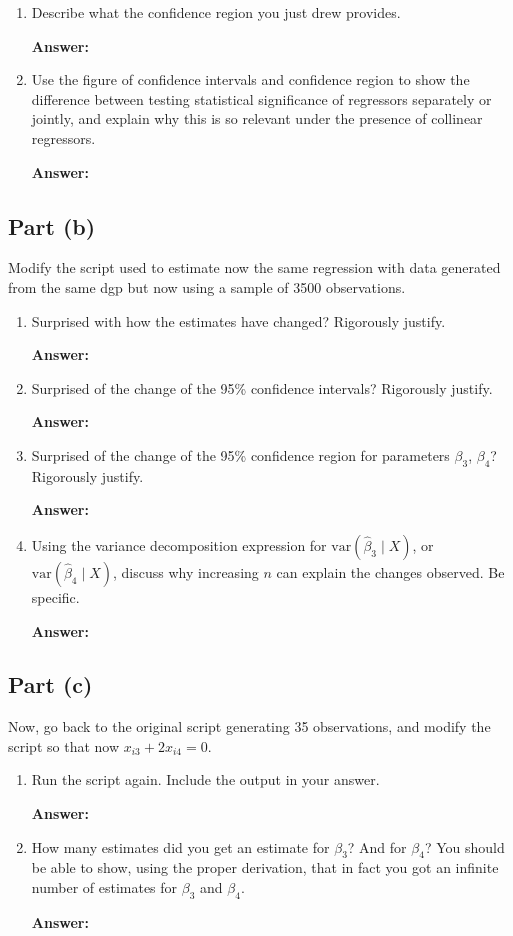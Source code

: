 \documentclass[12pt,a4paper]{article}
\begin{document}
\begin{enumerate}[label=(\roman*)]
  \item Describe what the confidence region you just drew provides.
  
  \textbf{Answer:} 
  
  \item Use the figure of confidence intervals and confidence region to show the difference between testing statistical significance of regressors separately or jointly, and explain why this is so relevant under the presence of collinear regressors.
  
  \textbf{Answer:} 
\end{enumerate}

\subsection*{Part (b)}
Modify the script used to estimate now the same regression with data generated from the same dgp but now using a sample of 3500 observations.

\begin{enumerate}[label=(\roman*)]
  \item Surprised with how the estimates have changed? Rigorously justify.
  
  \textbf{Answer:} 
  
  \item Surprised of the change of the 95\% confidence intervals? Rigorously justify.
  
  \textbf{Answer:} 
  
  \item Surprised of the change of the 95\% confidence region for parameters $\beta_3$, $\beta_4$? Rigorously justify.
  
  \textbf{Answer:} 
  
  \item Using the variance decomposition expression for $\text{var}(\hat{\beta}_3 \mid X)$, or $\text{var}(\hat{\beta}_4 \mid X)$, discuss why increasing $n$ can explain the changes observed. Be specific.
  
  \textbf{Answer:} 
\end{enumerate}

\subsection*{Part (c)}
Now, go back to the original script generating 35 observations, and modify the script so that now $x_{i3} + 2x_{i4} = 0$.

\begin{enumerate}[label=(\roman*)]
  \item Run the script again. Include the output in your answer.
  
  \textbf{Answer:} 
  
  \item How many estimates did you get an estimate for $\beta_3$? And for $\beta_4$? You should be able to show, using the proper derivation, that in fact you got an infinite number of estimates for $\beta_3$ and $\beta_4$.
  
  \textbf{Answer:} 
\end{enumerate}
\end{document}

